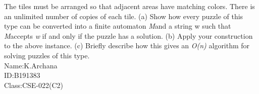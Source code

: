 \documentclass{knittingpattern}
\begin{document}
\vspace{0.5cm}

The tiles must be arranged so that adjacent areas have matching colors. There is an
unlimited number of copies of each tile.
\vspace{0.1cm}\flushleft
(a) Show how every puzzle of this type can be converted into a finite automaton \textit{M}and a string w such that \textit{M}accepts \textit{w} if and only if the puzzle has a solution.
\flushleft
(b) Apply your construction to the above instance.
\vspace{0.1cm}\flushleft
(c) Briefly describe how this gives an \textit{O(n)} algorithm for solving puzzles of this
type. \\
\vspace{5mm}
\raggedleft
Name:K.Archana \\
ID:B191383 \\
Class:CSE-022(C2)
\end{document}
